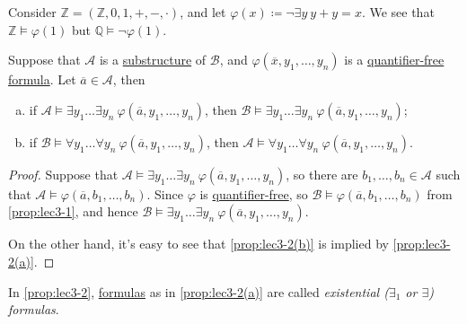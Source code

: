 \begin{eg}
	Consider \(\mathbb{Z} =(\mathbb{Z} , 0, 1, +, -, \cdot)\), and let \(\varphi (x)\coloneqq \lnot \exists y\ y + y = x\). We see that \(\mathbb{Z} \models \varphi (1)\) but \(\mathbb{Q} \models \lnot \varphi (1)\).
\end{eg}

\begin{proposition}\label{prop:lec3-2}
	Suppose that \(\mathcal{A} \) is a \hyperref[def:substructure]{substructure} of \(\mathcal{B} \), and \(\varphi (\overline{x}, y_1, \dots , y_n )\) is a \hyperref[not:quantifier-free]{quantifier-free} \hyperref[def:formula]{formula}. Let \(\overline{a} \in \mathcal{A} \), then
	\begin{enumerate}[(a)]
		\item\label{prop:lec3-2(a)} if \(\mathcal{A} \models \exists y_1 \dots \exists y_n\ \varphi (\overline{a} , y_1, \dots , y_n)\), then \(\mathcal{B} \models \exists y_1\dots \exists y_n\ \varphi (\overline{a} , y_1, \dots , y_n)\);
		\item\label{prop:lec3-2(b)} if \(\mathcal{B} \models \forall y_1 \dots \forall y_n\ \varphi (\overline{a} , y_1, \dots , y_n)\), then \(\mathcal{A} \models \forall y_1 \dots \forall y_n\ \varphi (\overline{a} , y_1, \dots , y_n)\).
	\end{enumerate}
\end{proposition}
\begin{proof}
	Suppose that \(\mathcal{A} \models \exists y_1 \dots \exists y_n\ \varphi (\overline{a} , y_1, \dots , y_n)\), so there are \(b_1, \dots , b_n \in \mathcal{A} \) such that \(\mathcal{A} \models \varphi (\overline{a} , b_1, \dots , b_n)\). Since \(\varphi \) is \hyperref[not:quantifier-free]{quantifier-free}, so \(\mathcal{B} \models \varphi (\overline{a} , b_1, \dots , b_n)\) from \autoref{prop:lec3-1}, and hence \(\mathcal{B} \models \exists y_1 \dots \exists y_n \ \varphi (\overline{a} , y_1, \dots , y_n)\).

	On the other hand, it's easy to see that \autoref{prop:lec3-2(b)} is implied by \autoref{prop:lec3-2(a)}.
\end{proof}

\begin{notation}[Existential]\label{not:existential}
	In \autoref{prop:lec3-2}, \hyperref[def:formula]{formulas} as in \autoref{prop:lec3-2(a)} are called \emph{existential (\(\exists _1\) or \(\exists \)) formulas}.
\end{notation}

